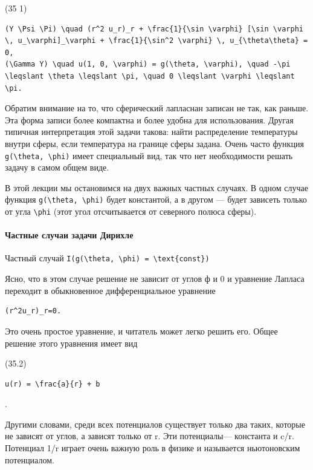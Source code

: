\documentclass[
  ukrainian,
]{article}
\begin{document}
(35 1)

\begin{verbatim}
(Y \Psi \Pi) \quad (r^2 u_r)_r + \frac{1}{\sin \varphi} [\sin \varphi \, u_\varphi]_\varphi + \frac{1}{\sin^2 \varphi} \, u_{\theta\theta} = 0,
(\Gamma Y) \quad u(1, 0, \varphi) = g(\theta, \varphi), \quad -\pi \leqslant \theta \leqslant \pi, \quad 0 \leqslant \varphi \leqslant \pi.
\end{verbatim}

Обратим внимание на то, что сферический лапласнан записан не так, как
раньше. Эта форма записи более компактна и более удобна для
использования. Другая типичная интерпретация этой задачи такова: найти
распределение температуры внутри сферы, если температура на границе
сферы задана. Очень часто функция
\texttt{g(\textbackslash{}theta,\ \textbackslash{}phi)} имеет
специальный вид, так что нет необходимости решать задачу в самом общем
виде.

В этой лекции мы остановимся на двух важных частных случаях. В одном
случае функция \texttt{g(\textbackslash{}theta,\ \textbackslash{}phi)}
будет константой, а в другом --- будет зависеть только от угла
\texttt{\textbackslash{}phi} (этот угол отсчитывается от северного
полюса сферы).

\paragraph{Частные случаи задачи
Дирихле}\label{ux447ux430ux441ux442ux43dux44bux435-ux441ux43bux443ux447ux430ux438-ux437ux430ux434ux430ux447ux438-ux434ux438ux440ux438ux445ux43bux435}

Частный случай
\texttt{I(g(\textbackslash{}theta,\ \textbackslash{}phi)\ =\ \textbackslash{}text\{const\})}

Ясно, что в этом случае решение не зависит от углов ф и 0 и уравнение
Лапласа переходит в обыкновенное дифференциальное уравнение

\begin{verbatim}
(r^2u_r)_r=0.
\end{verbatim}

Это очень простое уравнение, и читатель может легко решить его. Общее
решение этого уравнения имеет вид

(35.2)

\begin{verbatim}
u(r) = \frac{a}{r} + b
\end{verbatim}

.

Другими словами, среди всех потенциалов существует только два таких,
которые не зависят от углов, а зависят только от r. Эти потенциалы---
константа и c/r. Потенциал 1/r играет очень важную роль в физике и
называется ньютоновским потенциалом.
\end{document}
